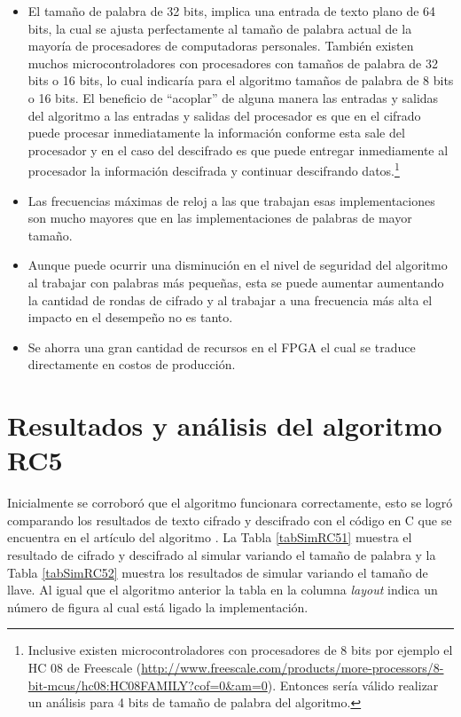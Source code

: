 \begin{itemize}
\item El tamaño de palabra de 32 bits, implica una entrada de texto plano de 64 bits, la cual se ajusta perfectamente al tamaño de palabra actual de la mayoría de procesadores de computadoras personales. También existen muchos microcontroladores con procesadores con tamaños de palabra de 32 bits o 16 bits, lo cual indicaría para el algoritmo tamaños de palabra de 8 bits o 16 bits. El beneficio de ``acoplar'' de alguna manera las entradas y salidas del algoritmo a las entradas y salidas del procesador es que en el cifrado puede procesar inmediatamente la información conforme esta sale del procesador y en el caso del descifrado es que puede entregar inmediamente al procesador la información descifrada y continuar descifrando datos.\footnote{Inclusive existen microcontroladores con procesadores de 8 bits por ejemplo el HC 08 de Freescale (\url{http://www.freescale.com/products/more-processors/8-bit-mcus/hc08:HC08FAMILY?cof=0&am=0}). Entonces sería válido realizar un análisis para 4 bits de tamaño de palabra del algoritmo.}

\item Las frecuencias máximas de reloj a las que trabajan esas implementaciones son mucho mayores que en las implementaciones de palabras de mayor tamaño.

\item Aunque puede ocurrir una disminución en el nivel de seguridad del algoritmo al trabajar con palabras más pequeñas, esta se puede aumentar aumentando la cantidad de rondas de cifrado y al trabajar a una frecuencia más alta el impacto en el desempeño no es tanto.

\item Se ahorra una gran cantidad de recursos en el FPGA el cual se traduce directamente en costos de producción.
\end{itemize}


\section{Resultados y análisis del algoritmo RC5}
Inicialmente se corroboró que el algoritmo funcionara correctamente, esto se logró comparando los resultados de texto cifrado y descifrado con el código en C que se encuentra en el artículo del algoritmo \citep{rivest}. La Tabla \ref{tabSimRC51} muestra el resultado de cifrado y descifrado al simular variando el tamaño de palabra y la Tabla \ref{tabSimRC52} muestra los resultados de simular variando el tamaño de llave. Al igual que el algoritmo anterior la tabla en la columna \textit{layout} indica un número de figura al cual está ligado la implementación.

